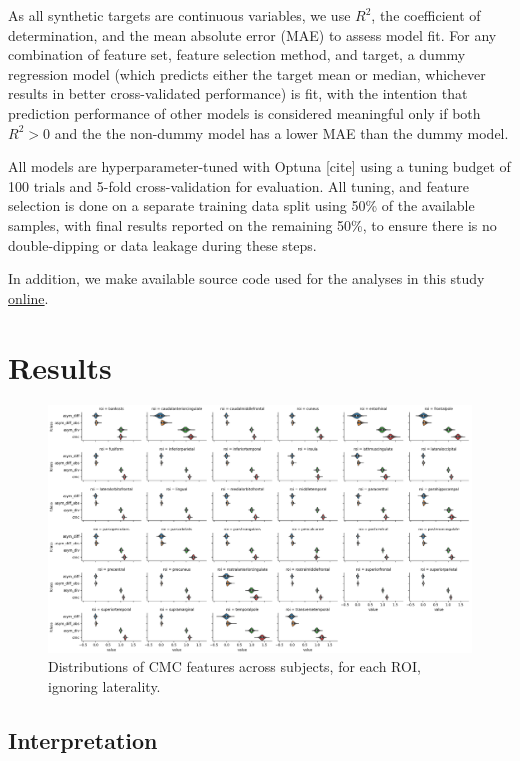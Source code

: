\documentclass{article}
\begin{document}
As all synthetic targets are continuous variables, we use \(R^2\), the
coefficient of determination, and the mean absolute error (MAE) to assess
model fit. For any combination of feature set, feature selection method, and
target, a dummy regression model (which predicts either the target mean or
median, whichever results in better cross-validated performance) is fit, with
the intention that prediction performance of other models is considered
meaningful only if both \(R^2 > 0\) and the the non-dummy model has a lower MAE
than the dummy model.

All models are hyperparameter-tuned with Optuna [cite] using a tuning budget of
100 trials and 5-fold cross-validation for evaluation. All tuning, and feature
selection is done on a separate training data split using 50\% of the available
samples, with final results reported on the remaining 50\%, to ensure there is
no double-dipping or data leakage during these steps.

In addition, we make available source code used for the analyses in this
study \href{https://github.com/stfxecutables/cortical_congruence}{online}.


\section{Results}


\begin{figure}
	\centering
	\includegraphics[width=6.5in]{figures/cmc_violins.png}
	\caption{Distributions of CMC features across subjects, for each ROI, ignoring laterality.}
	\label{fig:violins}
\end{figure}


\subsection{Interpretation}
\end{document}
